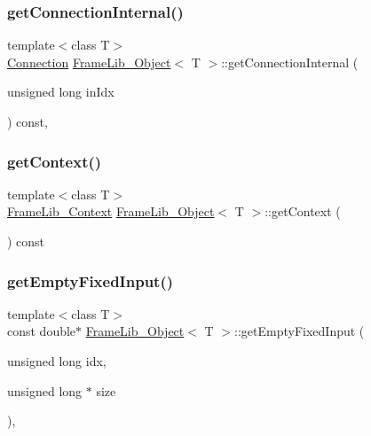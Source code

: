 \subsubsection{\texorpdfstring{get\+Connection\+Internal()}{getConnectionInternal()}}
{\footnotesize\ttfamily template$<$class T$>$ \\
\hyperlink{struct_frame_lib___object_1_1_connection}{Connection} \hyperlink{class_frame_lib___object}{Frame\+Lib\+\_\+\+Object}$<$ T $>$\+::get\+Connection\+Internal (\begin{DoxyParamCaption}\item[{unsigned long}]{in\+Idx }\end{DoxyParamCaption}) const\hspace{0.3cm}{\ttfamily [inline]}, {\ttfamily [protected]}}

\mbox{\label{class_frame_lib___object_a8f636902888847c78cf16d74717bd861}} 
\subsubsection{\texorpdfstring{get\+Context()}{getContext()}}
{\footnotesize\ttfamily template$<$class T$>$ \\
\hyperlink{class_frame_lib___context}{Frame\+Lib\+\_\+\+Context} \hyperlink{class_frame_lib___object}{Frame\+Lib\+\_\+\+Object}$<$ T $>$\+::get\+Context (\begin{DoxyParamCaption}{ }\end{DoxyParamCaption}) const\hspace{0.3cm}{\ttfamily [inline]}}

\mbox{\label{class_frame_lib___object_a604899fbd09fd9b37502ecb07a831b30}} 
\subsubsection{\texorpdfstring{get\+Empty\+Fixed\+Input()}{getEmptyFixedInput()}}
{\footnotesize\ttfamily template$<$class T$>$ \\
const double$\ast$ \hyperlink{class_frame_lib___object}{Frame\+Lib\+\_\+\+Object}$<$ T $>$\+::get\+Empty\+Fixed\+Input (\begin{DoxyParamCaption}\item[{unsigned long}]{idx,  }\item[{unsigned long $\ast$}]{size }\end{DoxyParamCaption})\hspace{0.3cm}{\ttfamily [inline]}, {\ttfamily [protected]}}


